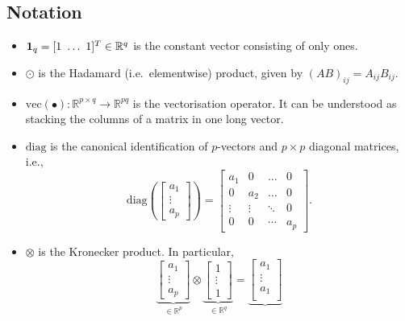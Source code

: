 \documentclass{article}
\begin{document}
\subsection{Notation}
\begin{itemize}
    \item $\vb{1}_q = [1\,\, \dots\,\, 1]^T \in \mathbb{R}^q$ is the constant vector consisting of only ones.
    \item $\odot$ is the Hadamard (i.e.\, elementwise) product, given by $(AB)_{ij} = A_{ij} B_{ij}$.
    \item $\mathrm{vec}(\bullet): \mathbb{R}^{p \times q} \rightarrow \mathbb{R}^{pq}$ is the vectorisation operator. It can be understood as stacking the columns of a matrix in one long vector. 
    \item $\mathrm{diag}$ is the canonical identification of $p$-vectors and $p \times p$ diagonal matrices, i.e.,
    $$
    \mathrm{diag}\left(
    \begin{bmatrix}
        a_1 \\ 
        \vdots \\
        a_p
    \end{bmatrix}
    \right)
    =
    \begin{bmatrix}
        a_1 & 0 & \dots & 0 \\
        0 & a_2 & \dots & 0 \\
        \vdots & \vdots & \ddots & 0 \\
        0 & 0 & \cdots & a_p
    \end{bmatrix}
    .$$
    \item $\otimes$ is the Kronecker product. In particular,
        $$
        \underbrace{
        \begin{bmatrix}
            a_1 \\
            \vdots \\
            a_p
        \end{bmatrix}
        }_{\in \mathbb{R}^{p}}
        \otimes 
        \underbrace{
        \begin{bmatrix}
            1 \\
            \vdots \\
            1
        \end{bmatrix}
        }_{\in \mathbb{R}^{q}}
        =
        \underbrace{
        \begin{bmatrix}
            a_1 \\
            \vdots \\
            a_1 \\

\end{bmatrix}}$$
\end{itemize}
\end{document}
